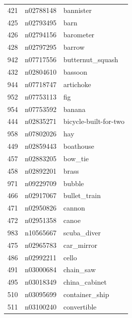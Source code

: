 \begin{table}
\begin{tabular}{cll}
421 & n02788148 & bannister \\
425 & n02793495 & barn \\
426 & n02794156 & barometer \\
428 & n02797295 & barrow \\
942 & n07717556 & butternut_squash \\
432 & n02804610 & bassoon \\
944 & n07718747 & artichoke \\
952 & n07753113 & fig \\
954 & n07753592 & banana \\
444 & n02835271 & bicycle-built-for-two \\
958 & n07802026 & hay \\
449 & n02859443 & boathouse \\
457 & n02883205 & bow_tie \\
458 & n02892201 & brass \\
971 & n09229709 & bubble \\
466 & n02917067 & bullet_train \\
471 & n02950826 & cannon \\
472 & n02951358 & canoe \\
983 & n10565667 & scuba_diver \\
475 & n02965783 & car_mirror \\
486 & n02992211 & cello \\
491 & n03000684 & chain_saw \\
495 & n03018349 & china_cabinet \\
510 & n03095699 & container_ship \\
511 & n03100240 & convertible \\
\bottomrule
\end{tabular}
\end{table}
